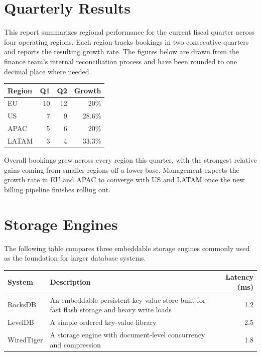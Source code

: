 \documentclass[11pt,letterpaper]{article}
\begin{document}
\section*{Quarterly Results}

This report summarizes regional performance for the current fiscal quarter across four operating regions.
Each region tracks bookings in two consecutive quarters and reports the resulting growth rate.
The figures below are drawn from the finance team's internal reconciliation process and have been rounded to one decimal place where needed.

\begin{center}
\begin{tabular}{l r r r}
\toprule
Region & Q1 & Q2 & Growth \\
\midrule
EU    & 10 & 12 & 20\%   \\
US    & 7  & 9  & 28.6\% \\
APAC  & 5  & 6  & 20\%   \\
LATAM & 3  & 4  & 33.3\% \\
\bottomrule
\end{tabular}
\end{center}

Overall bookings grew across every region this quarter, with the strongest relative gains coming from smaller regions off a lower base.
Management expects the growth rate in EU and APAC to converge with US and LATAM once the new billing pipeline finishes rolling out.

\newpage

\section*{Storage Engines}

The following table compares three embeddable storage engines commonly used as the foundation for larger database systems.

\begin{center}
\begin{tabular}{|l|p{5cm}|r|}
\hline
System & Description & Latency (ms) \\
\hline
RocksDB & An embeddable persistent key-value store built for fast flash storage and heavy write loads & 1.2 \\
\hline
LevelDB & A simple ordered key-value library & 2.5 \\
\hline
WiredTiger & A storage engine with document-level concurrency and compression & 1.8 \\
\hline
\end{tabular}
\end{center}
\end{document}
